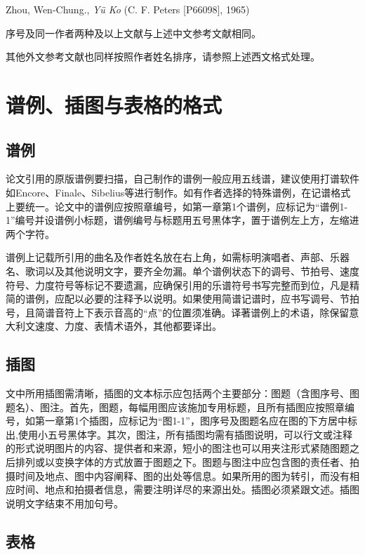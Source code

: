 Zhou, Wen-Chung., \textit{Yü Ko} (C. F. Peters [P66098], 1965)

序号及同一作者两种及以上文献与上述中文参考文献相同。

其他外文参考文献也同样按照作者姓名排序，请参照上述西文格式处理。

\section{谱例、插图与表格的格式}

\subsection{谱例}

论文引用的原版谱例要扫描，自己制作的谱例一般应用五线谱，建议使用打谱软件如Encore、Finale、Sibelius等进行制作。如有作者选择的特殊谱例，在记谱格式上要统一。论文中的谱例应按照章编号，如第一章第1个谱例，应标记为“谱例1-1”编号并设谱例小标题，谱例编号与标题用五号黑体字，置于谱例左上方，左缩进两个字符。

谱例上记载所引用的曲名及作者姓名放在右上角，如需标明演唱者、声部、乐器名、歌词以及其他说明文字，要齐全勿漏。单个谱例状态下的调号、节拍号、速度符号、力度符号等标记不要遗漏，应确保引用的乐谱符号书写完整而到位，凡是精简的谱例，应配以必要的注释予以说明。如果使用简谱记谱时，应书写调号、节拍号，且简谱音符上下表示音高的“点”的位置须准确。译著谱例上的术语，除保留意大利文速度、力度、表情术语外，其他都要译出。

\subsection{插图}

文中所用插图需清晰，插图的文本标示应包括两个主要部分：图题（含图序号、图题名）、图注。首先，图题，每幅用图应该施加专用标题，且所有插图应按照章编号，如第一章第1个插图，应标记为“图1-1”，图序号及图题名应在图的下方居中标出,使用小五号黑体字。其次，图注，所有插图均需有插图说明，可以行文或注释的形式说明图片的内容、提供者和来源，短小的图注也可以用夹注形式紧随图题之后排列或以变换字体的方式放置于图题之下。图题与图注中应包含图的责任者、拍摄时间及地点、图中内容阐释、图的出处等信息。如果所用的图为转引，而没有相应时间、地点和拍摄者信息，需要注明详尽的来源出处。插图必须紧跟文述。插图说明文字结束不用加句号。

\subsection{表格}

